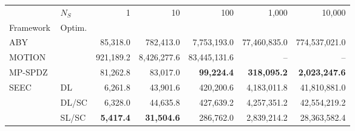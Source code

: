 \begin{tabular}{llrrrrr}
\toprule
 & $N_S$ & 1 & 10 & 100 & 1,000 & 10,000 \\
Framework & Optim. &  &  &  &  &  \\
\midrule
ABY~\cite{DSZ15} &  & 85,318.0 & 782,413.0 & 7,753,193.0 & 77,460,835.0 & 774,537,021.0 \\
\cline{1-7}
MOTION~\cite{BDST22} &  & 921,189.2 & 8,426,277.6 & 83,445,131.6 & -- & -- \\
\cline{1-7}
MP-SPDZ~\cite{CCS:Keller20} &  & 81,262.8 & 83,017.0 & \bfseries 99,224.4 & \bfseries 318,095.2 & \bfseries 2,023,247.6 \\
\cline{1-7}
\multirow[c]{3}{*}{SEEC} & DL & 6,261.8 & 43,901.6 & 420,200.6 & 4,183,011.8 & 41,810,881.0 \\
 & DL/SC & 6,328.0 & 44,635.8 & 427,639.2 & 4,257,351.2 & 42,554,219.2 \\
 & SL/SC & \bfseries 5,417.4 & \bfseries 31,504.6 & 286,762.0 & 2,839,214.2 & 28,363,582.4 \\
\bottomrule
\end{tabular}
